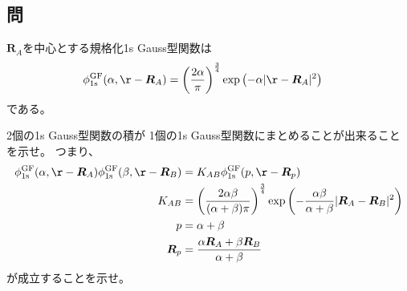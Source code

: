 \subsection{問}
$\bm{R}_A$を中心とする規格化1s Gauss型関数は
\begin{align}
	\phi^{\rm GF}_{\rm 1s}(\alpha,\r-\bm{R}_{A})
&=
	\left(
		\frac{2\alpha}{\pi}
	\right)^{\frac{3}{4}}
	\exp\left(
		-\alpha|\r-\bm{R}_{A}|^2
	\right)
\end{align}
である。

2個の1s Gauss型関数の積が
1個の1s Gauss型関数にまとめることが出来ることを示せ。
つまり、
\begin{align}
	\phi^{\rm GF}_{\rm 1s}(\alpha,\r-\bm{R}_A)
	\phi^{\rm GF}_{\rm 1s}(\beta,\r-\bm{R}_B)
&=
	K_{AB}
	\phi^{\rm GF}_{\rm 1s}(p,\r-\bm{R}_p) \\
%
%
	K_{AB}
&=
	\left(
		\frac{2\alpha\beta}{(\alpha+\beta)\pi}
	\right)^{\frac{3}{4}}
	\exp\left(
		-\frac{\alpha\beta}{\alpha+\beta}
		|\bm{R}_A-\bm{R}_B|^2
	\right) \\
%
%
	p
&=
	\alpha
	+
	\beta \\
%
%
	\bm{R}_p
&=
	\frac{
		\alpha\bm{R}_A
		+
		\beta\bm{R}_B
	}{
		\alpha
		+
		\beta
	}
\end{align}
が成立することを示せ。


